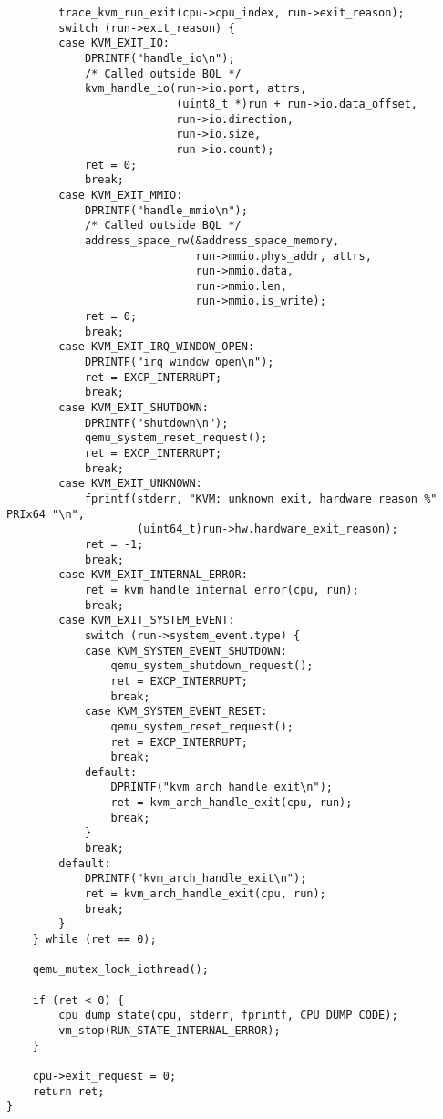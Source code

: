 \documentclass[9pt,b5paper,tombo]{jsbook}
\begin{document}
\begin{lstlisting}
        trace_kvm_run_exit(cpu->cpu_index, run->exit_reason);
        switch (run->exit_reason) {
        case KVM_EXIT_IO:
            DPRINTF("handle_io\n");
            /* Called outside BQL */
            kvm_handle_io(run->io.port, attrs,
                          (uint8_t *)run + run->io.data_offset,
                          run->io.direction,
                          run->io.size,
                          run->io.count);
            ret = 0;
            break;
        case KVM_EXIT_MMIO:
            DPRINTF("handle_mmio\n");
            /* Called outside BQL */
            address_space_rw(&address_space_memory,
                             run->mmio.phys_addr, attrs,
                             run->mmio.data,
                             run->mmio.len,
                             run->mmio.is_write);
            ret = 0;
            break;
        case KVM_EXIT_IRQ_WINDOW_OPEN:
            DPRINTF("irq_window_open\n");
            ret = EXCP_INTERRUPT;
            break;
        case KVM_EXIT_SHUTDOWN:
            DPRINTF("shutdown\n");
            qemu_system_reset_request();
            ret = EXCP_INTERRUPT;
            break;
        case KVM_EXIT_UNKNOWN:
            fprintf(stderr, "KVM: unknown exit, hardware reason %" PRIx64 "\n",
                    (uint64_t)run->hw.hardware_exit_reason);
            ret = -1;
            break;
        case KVM_EXIT_INTERNAL_ERROR:
            ret = kvm_handle_internal_error(cpu, run);
            break;
        case KVM_EXIT_SYSTEM_EVENT:
            switch (run->system_event.type) {
            case KVM_SYSTEM_EVENT_SHUTDOWN:
                qemu_system_shutdown_request();
                ret = EXCP_INTERRUPT;
                break;
            case KVM_SYSTEM_EVENT_RESET:
                qemu_system_reset_request();
                ret = EXCP_INTERRUPT;
                break;
            default:
                DPRINTF("kvm_arch_handle_exit\n");
                ret = kvm_arch_handle_exit(cpu, run);
                break;
            }
            break;
        default:
            DPRINTF("kvm_arch_handle_exit\n");
            ret = kvm_arch_handle_exit(cpu, run);
            break;
        }
    } while (ret == 0);

    qemu_mutex_lock_iothread();

    if (ret < 0) {
        cpu_dump_state(cpu, stderr, fprintf, CPU_DUMP_CODE);
        vm_stop(RUN_STATE_INTERNAL_ERROR);
    }

    cpu->exit_request = 0;
    return ret;
}
\end{lstlisting}
\end{document}
